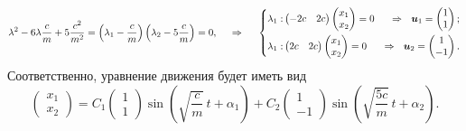 \begin{equation*}
    \lambda^2 - 6 \lambda \frac{c}{m} + 5 \frac{c^2}{m^2} = 
    \left(\lambda_1 -  \frac{c}{m}\right)
    \left(\lambda_2 - 5 \frac{c}{m}\right)
    = 0,
    \hspace{0.5cm} \Rightarrow \hspace{0.5cm}
    \left\{\begin{aligned}
        \lambda_1: & \begin{pmatrix}
            -2c & 2c
        \end{pmatrix}
        \begin{pmatrix}
            x_1 \\ x_2
        \end{pmatrix} = 0
        &\Rightarrow
        \ \ \mbox{\boldmath $u$}_1 = \begin{pmatrix}
            1 \\ 1
        \end{pmatrix}; \\
        \lambda_1: & \begin{pmatrix}
            2c & 2c
        \end{pmatrix}
        \begin{pmatrix}
            x_1 \\ x_2
        \end{pmatrix} = 0
        &\Rightarrow
        \ \ \mbox{\boldmath $u$}_2 = \begin{pmatrix}
            1 \\ -1
        \end{pmatrix}.
    \end{aligned}\right.
\end{equation*}
Соответственно, уравнение движения будет иметь вид
\begin{equation*}
    \begin{pmatrix}
        x_1 \\ x_2
    \end{pmatrix} = 
    C_1 
    \begin{pmatrix}
        1 \\ 1
    \end{pmatrix} 
        \sin\left(
            \sqrt{\frac{c}{m}}\,  t + \alpha_1
        \right)
    +
    C_2
    \begin{pmatrix}
        1 \\ -1
    \end{pmatrix}
    \sin\left(
        \sqrt{\frac{5c}{m}} \, t + \alpha_2
    \right).
\end{equation*}




